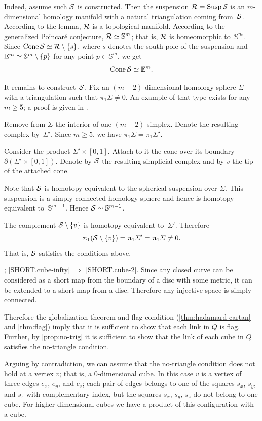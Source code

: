 Indeed, assume such $\mathcal{S}$ is constructed.
Then the suspension
$\spc{R}\z=\Susp\spc{S}$
is an $m$-dimensional homology manifold with a natural triangulation coming from~$\mathcal{S}$.
According to the lemma,
$\mathcal{R}$ is a topological manifold.
According to the generalized Poincar\'{e} conjecture,
$\mathcal{R}\simeq\mathbb{S}^m$;
that is, $\mathcal{R}$ is homeomorphic to~$\mathbb{S}^m$.
Since $\mathop{\rm Cone}\nolimits \mathcal{S}\simeq \mathcal{R}\setminus\{s\}$, where $s$ denotes the south pole of the suspension
and $\mathbb{E}^m\simeq \mathbb{S}^m\setminus\{p\}$
for any point $p\in \mathbb{S}^m$,
we get 
\[\mathop{\rm Cone}\nolimits \mathcal{S}\simeq\mathbb{E}^m.\]

It remains to construct~$\mathcal{S}$.
Fix an $(m-2)$-dimensional homology sphere $\Sigma$ with a triangulation such that $\pi_1\Sigma\ne0$.
An example of that type exists for any $m\ge 5$; a proof is given in \cite{kervaire}.

Remove from $\Sigma$ the interior of one $(m-2)$-simplex.
Denote the resulting complex by~$\Sigma'$.
Since $m\ge 5$, we have $\pi_1\Sigma=\pi_1\Sigma'$.

Consider the product $\Sigma'\times [0,1]$. 
Attach to it the cone over its boundary $\partial (\Sigma'\times [0,1])$.
Denote by $\mathcal{S}$ the resulting simplicial complex
and by $v$ the tip of the attached cone.

Note that $\mathcal{S}$ is homotopy equivalent to the spherical suspension over $\Sigma$.
This suspension is a simply connected homology sphere and hence is homotopy equivalent to~$\mathbb{S}^{m-1}$.
 Hence $\mathcal{S}\sim\mathbb{S}^{m-1}$.

The complement $\mathcal{S}\setminus\{v\}$ is homotopy equivalent to~$\Sigma'$.
Therefore 
\[
\uppi_1(\mathcal{S}\setminus\{v\})
=\uppi_1\varSigma'
=\uppi_1\varSigma\ne 0.
\]
That is, $\mathcal{S}$ satisfies the conditions above.


\parbf{\ref{ex:cube-infty=>cube-2}}; \ref{SHORT.cube-infty} $\Rightarrow$ \ref{SHORT.cube-2}.
Since any closed curve can be considered as a short map from the boundary of a disc with some metric, it can be extended to a short map from a disc.
Therefore any injective space is simply connected.

Therefore the globalization theorem and flag condition (\ref{thm:hadamard-cartan} and \ref{thm:flag}) imply that it is sufficient to show that each link in $Q$ is flag.
Further, by \ref{prop:no-trig} it is sufficient to show that the link of each cube in $Q$ satisfies the no-triangle condition.

Arguing by contradiction, we can assume that the no-triangle condition does not hold at a vertex $v$; that is, a 0-dimensional cube.
In this case $v$ is a vertex of three edges $e_x$, $e_y$, and $e_z$;
each pair of edges belongs to one of the squares $s_x$, $s_y$, and $s_z$ with complementary index, but the squares $s_x$, $s_y$, $s_z$ do not belong to one cube.
For higher dimensional cubes we have a product of this configuration with a cube.

